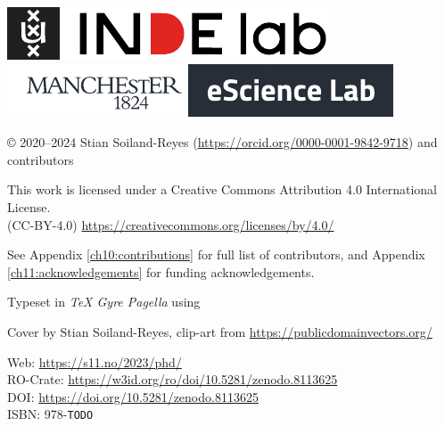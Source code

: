 \newpage

\vspace*{\fill}

\includegraphics{figures/indelab}\hspace{2em}
\includegraphics{figures/escienceLab-logo}

© 2020--2024 Stian Soiland-Reyes 
(\url{https://orcid.org/0000-0001-9842-9718})
and contributors

This work is licensed under a Creative Commons Attribution 4.0 International License. \\
(CC-BY-4.0) \url{https://creativecommons.org/licenses/by/4.0/}

See Appendix \ref{ch10:contributions} for full list of contributors, and Appendix \ref{ch11:acknowledgements} for funding acknowledgements.


Typeset in \emph{TeX Gyre Pagella} using \mybanner

Cover by Stian Soiland-Reyes, clip-art from \url{https://publicdomainvectors.org/}

Web: \url{https://s11.no/2023/phd/} \\
RO-Crate: \url{https://w3id.org/ro/doi/10.5281/zenodo.8113625}\\
DOI: \url{https://doi.org/10.5281/zenodo.8113625}\\
ISBN: 978-\texttt{TODO}

\newpage
\thispagestyle{empty} 

